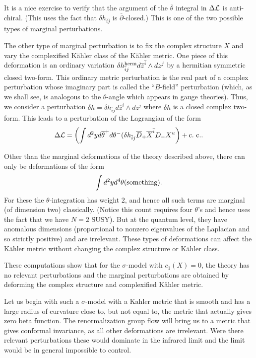 It is a nice exercise to verify that the argument of the $\overline{\theta}$
integral  in $\Delta {\cal L}$ is
anti-chiral. (This uses the fact that $\delta h_{\overline i \overline j}$ is
$\overline\partial $-closed.) This  is one of the two
possible types of marginal perturbations.

The other type of marginal perturbation is to fix the complex
structure $X$ and vary the complexified K\"ahler class of the K\"ahler
metric. One piece of this deformation is an ordinary  variation
$\delta h^{\rm herm}_{\overline i j}d\overline z^{\overline i}\wedge
dz^j$ by a
hermitian  symmetric closed
two-form. This ordinary metric perturbation is the real part of a
complex perturbation whose imaginary part is called the ``$B$-field''
perturbation (which, as we shall see, is analogous to the $\theta$-angle
which appears in gauge theories).  Thus, we consider a perturbation
$\delta h=\delta h_{\overline i j}d\overline z^{\overline i}\wedge
dz^j$  where $\delta h$ is a closed complex two-form.
This leads to a perturbation of the Lagrangian of the form
$$\Delta{\cal L}=\left(\int d^2yd\overline\theta^+d \theta^-(\delta
h_{\overline i
j}\overline D_+\overline X^{\overline i}D_-X^u\right)+{\rm c.\ c.}.$$

Other than the marginal deformations of the theory described above, there
can only be deformations of the form
$$\int d^2y d^4\theta({\rm something}).$$
For these the $\theta$-integration has weight $2$, and hence all such
terms are marginal (of dimension two) classically.
(Notice this count requires four $\theta$'s and
hence uses the fact that we have $N=2$ SUSY).  But at the quantum level,
they have anomalous dimensions (proportional to nonzero eigenvalues of the
Laplacian and so strictly positive) and are irrelevant.
 These types of deformations can affect the
K\"ahler metric without changing the complex structure or K\"ahler
class.

These computations show that
for the  $\sigma$-model with
$c_1(X)=0$, the theory has no relevant perturbations and the
marginal perturbations are obtained by deforming the complex structure
and complexified K\"ahler metric.

Let us begin with such a $\sigma$-model with a Kahler metric that is smooth and
has a large radius of curvature close to,
but not equal to, the metric that actually gives zero beta function.
The renormalization group flow will bring us to a metric that gives
conformal invariance, as all other deformations are irrelevant.
Were there relevant perturbations these would dominate in the infrared limit
and the limit would be in general impossible to control.





